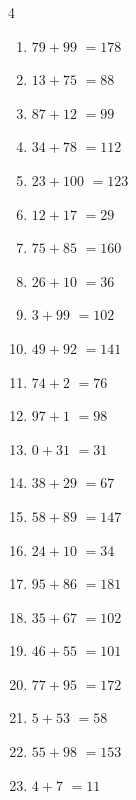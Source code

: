 \begin{multicols}{4}
\begin{enumerate}
  \item $79+99$
        $=178$

  \item $13+75$
        $=88$

  \item $87+12$
        $=99$

  \item $34+78$
        $=112$

  \item $23+100$
        $=123$

  \item $12+17$
        $=29$

\columnbreak %

  \item $75+85$
        $=160$

  \item $26+10$
        $=36$

  \item $3+99$
        $=102$

  \item $49+92$
        $=141$

  \item $74+2$
        $=76$

  \item $97+1$
        $=98$

  \item $0+31$
        $=31$

  \item $38+29$
        $=67$

  \item $58+89$
        $=147$

  \item $24+10$
        $=34$

  \item $95+86$
        $=181$

  \item $35+67$
        $=102$

  \item $46+55$
        $=101$

  \item $77+95$
        $=172$

  \item $5+53$
        $=58$

  \item $55+98$
        $=153$

  \item $4+7$
        $=11$


\end{enumerate}
\end{multicols}
